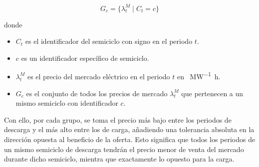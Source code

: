 \begin{samepage}

  \begin{equation}
    \label{eq:agrupado-periodos}
    G_{c} = \{ \lambda^{M}_{t} \mid C_{t} = c \}
  \end{equation}

  donde

  \begin{itemize}

    \item \( C_{t} \) es el identificador del semiciclo con signo en el periodo \( t \).

    \item \( c \) es un identificador específico de semiciclo.

    \item \( \lambda^{M}_{t} \) es el precio del mercado eléctrico en el periodo \( t \) en \si{\text{\euro}\per\mega\watt\hour}.

    \item \( G_{c} \) es el conjunto de todos los precios de mercado \( \lambda^{M}_{t} \) que pertenecen a un mismo semiciclo con identificador \( c \).

  \end{itemize}

\end{samepage}

Con ello, por cada grupo, se toma el precio más bajo entre los periodos de descarga y el más alto entre los de carga, añadiendo una tolerancia absoluta en la dirección opuesta al beneficio de la oferta. Esto significa que todos los periodos de un mismo semiciclo de descarga tendrán el precio menor de venta del mercado durante dicho semiciclo, mientra que exactamente lo opuesto para la carga.

